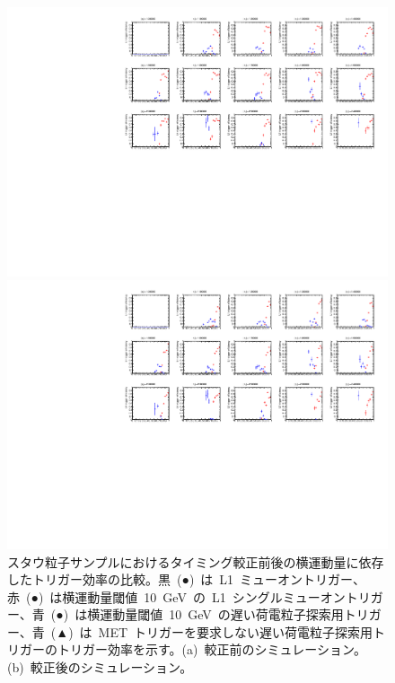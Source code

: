\begin{figure}[H]
    \begin{minipage}{0.49\hsize}
    \centering   
    \includegraphics[width=\textwidth,page=4]{img/rec/stau_600_ori.pdf}
    \subcaption{}
    \end{minipage}
    \begin{minipage}{0.49\hsize}
    \centering   
    \includegraphics[width=\textwidth,page=4]{img/rec/stau_600.pdf}
    \subcaption{}
    \end{minipage}
    \caption[スタウ粒子サンプルにおけるタイミング較正前後の横運動量に依存したトリガー効率の比較]{スタウ粒子サンプルにおけるタイミング較正前後の横運動量に依存したトリガー効率の比較。黒~(●)~は~L1~ミューオントリガー、赤~(●)~は横運動量閾値~10~GeV~の~L1~シングルミューオントリガー、青~(●)~は横運動量閾値~10~GeV~の遅い荷電粒子探索用トリガー、青~(▲)~は~MET~トリガーを要求しない遅い荷電粒子探索用トリガーのトリガー効率を示す。(a)~較正前のシミュレーション。(b)~較正後のシミュレーション。}\label{fig:tript}
\end{figure}
